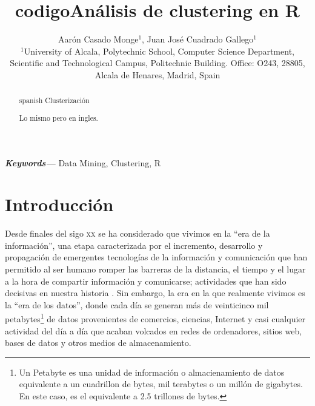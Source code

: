 \documentclass[10pt, a4paper]{article}
\title{codigo}
\providecommand{\keywords}[1]
    {
      \small	
      \textbf{\textit{Keywords---}} #1
    }
\begin{document}
    
    
    
    
    \title{Análisis de clustering en R}
    
    \author{Aarón Casado Monge$^{1}$, Juan José Cuadrado Gallego$^{1}$  \\
      \small $^{1}$University of Alcala, Polytechnic School, Computer Science Department, Scientific and Technological Campus, Politechnic Building. Office: O243, 28805, Alcala de Henares, Madrid, Spain}
    
    \begin{abstract}{spanish}
        Clusterización
    \end{abstract}
    
    
    \begin{abstract}
       Lo mismo pero en ingles.
    \end{abstract}
    
    \keywords{Data Mining, Clustering, R}
    
  \maketitle
    
    

\section{Introducción}

Desde finales del sigo \textsc{xx} se ha considerado que vivimos en la ``era de la información'', una etapa caracterizada por el incremento, desarrollo y propagación de emergentes tecnologías de la información y comunicación que han permitido al ser humano romper las barreras de la distancia, el tiempo y el lugar a la hora de compartir información y comunicarse; actividades que han sido decisivas en nuestra historia \cite{INTRODUCCION}. Sin embargo, la era en la que realmente vivimos es la ``era de los datos'', donde cada día se generan más de veinticinco mil petabytes\footnote {Un Petabyte es una unidad de información o almacienamiento de datos equivalente a un cuadrillon de bytes, mil terabytes o un millón de gigabytes. En este caso, es el equivalente a 2.5 trillones de bytes.} de datos provenientes de comercios, ciencias, Internet y casi cualquier actividad del día a día \cite{DATA NEVER SLEEP} que acaban volcados en redes de ordenadores, sitios web, bases de datos y otros medios de almacenamiento. 
\end{document}
